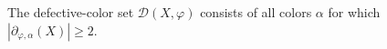 \begin{definition}
The defective-color set $\mathcal D(X,\varphi)$ consists of all colors
$\alpha$ for which $|\partial_{\varphi,\alpha}(X)|\geq2$.
\end{definition}
